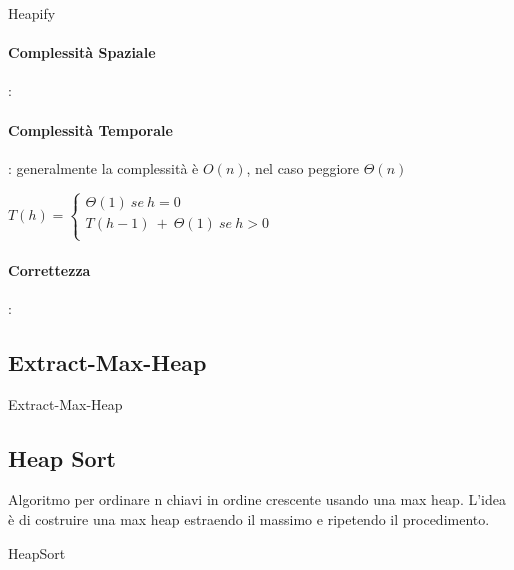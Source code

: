 \documentclass{article}
\begin{document}
\begin{algorithm}[H]
\caption{Heapify}
\end{algorithm}

\paragraph{Complessità Spaziale}: 
\paragraph{Complessità Temporale}: generalmente la complessità è $O(n)$, nel caso peggiore $\Theta(n)$

$T(h) =\begin{cases}
    \Theta(1) \ se \ h = 0 \\
    T(h-1) \ + \ \Theta(1) \ se \ h > 0 \\
\end{cases}$
\paragraph{Correttezza}:

\hypertarget{extractmaxheap}{}\subsection{Extract-Max-Heap} %

\begin{algorithm}[H]
\caption{Extract-Max-Heap}
\end{algorithm}


    
\hypertarget{heapsort}{}\subsection{Heap Sort} %
Algoritmo per ordinare n chiavi in ordine crescente usando una max heap. L'idea è di costruire una max heap estraendo il massimo e ripetendo il procedimento.
\begin{algorithm}[H]
\caption{HeapSort}
\end{algorithm}
\end{document}

